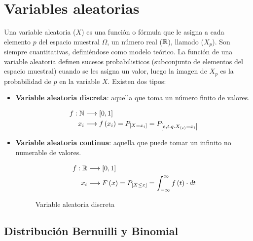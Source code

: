 \section{Variables aleatorias}
Una variable aleatoria ($X$) es una función o fórmula que le asigna a cada elemento $p$ del espacio muestral $\Omega$, un número real ($\mathbb{R}$), llamado ($X_p$). Son siempre cuantitativas, definiéndose como modelo teórico. La función de una variable aleatoria definen sucesos probabilisticos (subconjunto de elementos del espacio muestral) cuando se les asigna un valor, luego la imagen de $X_p$ es la probabilidad de $p$ en la variable $X$. Existen dos tipos:
\begin{itemize}[itemsep=0pt,parsep=0pt,topsep=0pt,partopsep=0pt]
    \item \textbf{Variable aleatoria discreta}: aquella que toma un número finito de valores.
    \begin{figure}[H]
        \centering
        \begin{equation*}
            \begin{split}
                f: \mathbb{N} &\longrightarrow \left[ 0, 1\right] \\
                x_i &\longrightarrow f\left( x_i\right) = P _{\left[ X = x_i\right]} = P _{\left[ e, t.q. X_{\left( e\right)}=x_i \right]}\\
            \end{split}
        \end{equation*}
    \end{figure}
    \item\textbf{Variable aleatoria continua}: aquella que puede tomar un infinito no numerable de valores.
    \begin{figure}[H]
        \centering
        \begin{equation*}
            \begin{split}
                f: \mathbb{R} &\longrightarrow \left[ 0, 1\right] \\
                x_i &\longrightarrow F\left( x\right) = P _{\left[ X \leq x \right]} = \int_{-\infty}^{\infty} f\left( t\right) \cdot dt
            \end{split}                
        \end{equation*}
        \caption*{Variable aleatoria discreta}
    \end{figure}
\end{itemize}
\subsection{Distribución Bernuilli y Binomial}
